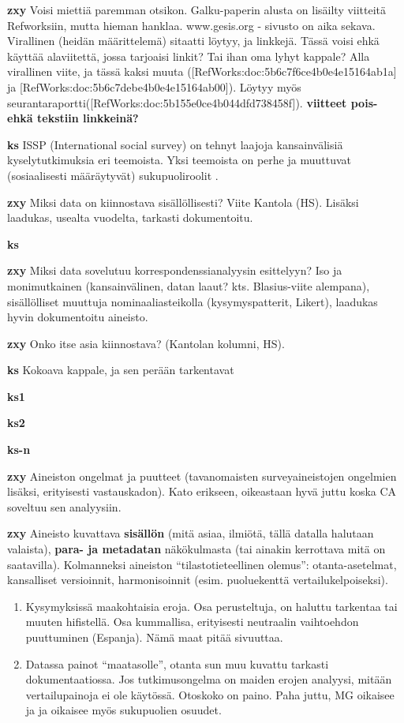 \documentclass[
  finnish,
]{book}
\begin{document}
\textbf{zxy} Voisi miettiä paremman otsikon. Galku-paperin alusta on lisäilty viitteitä Refworksiin, mutta hieman hanklaa. www.gesis.org - sivusto on aika sekava. Virallinen (heidän määrittelemä) sitaatti löytyy, ja linkkejä. Tässä voisi ehkä käyttää alaviitettä, jossa tarjoaisi linkit? Tai ihan oma lyhyt kappale? Alla virallinen viite, ja tässä kaksi muuta ({[}RefWorks:doc:5b6c7f6ce4b0e4e15164ab1a{]} ja {[}RefWorks:doc:5b6c7debe4b0e4e15164ab00{]}). Löytyy myös seurantaraportti({[}RefWorks:doc:5b155e0ce4b044dfd738458f{]}). \textbf{viitteet pois- ehkä tekstiin linkkeinä?}

\textbf{ks} ISSP (International social survey) on tehnyt laajoja kansainvälisiä kyselytutkimuksia eri teemoista. Yksi teemoista on perhe ja muuttuvat (sosiaalisesti määräytyvät) sukupuoliroolit \citep{RefWorks:doc:5b6c7b0de4b0fd36f5bb4c2a}.

\textbf{zxy} Miksi data on kiinnostava sisällöllisesti? Viite Kantola (HS). Lisäksi laadukas, usealta vuodelta, tarkasti dokumentoitu.

\textbf{ks}

\textbf{zxy} Miksi data sovelutuu korrespondenssianalyysin esittelyyn? Iso ja monimutkainen (kansainvälinen, datan laaut? kts. Blasius-viite alempana), sisällölliset muuttuja nominaaliasteikolla (kysymyspatterit, Likert), laadukas hyvin dokumentoitu aineisto.

\textbf{zxy} Onko itse asia kiinnostava? (Kantolan kolumni, HS).

\textbf{ks} Kokoava kappale, ja sen perään tarkentavat

\textbf{ks1}

\textbf{ks2}

\textbf{ks-n}

\textbf{zxy} Aineiston ongelmat ja puutteet (tavanomaisten surveyaineistojen ongelmien lisäksi, erityisesti vastauskadon). Kato erikseen, oikeastaan hyvä juttu koska CA soveltuu sen analyysiin.

\textbf{zxy} Aineisto kuvattava \textbf{sisällön} (mitä asiaa, ilmiötä, tällä datalla halutaan valaista), \textbf{para- ja metadatan} näkökulmasta (tai ainakin kerrottava mitä on saatavilla). Kolmanneksi aineiston ``tilastotieteellinen olemus'': otanta-asetelmat, kansalliset versioinnit, harmonisoinnit (esim. puoluekenttä vertailukelpoiseksi).

\begin{enumerate}
\def\labelenumi{\arabic{enumi}.}
\item
  Kysymyksissä maakohtaisia eroja. Osa perusteltuja, on haluttu tarkentaa tai muuten hifistellä. Osa kummallisa, erityisesti neutraalin vaihtoehdon puuttuminen (Espanja). Nämä maat pitää sivuuttaa.
\item
  Datassa painot ``maatasolle'', otanta sun muu kuvattu tarkasti dokumentaatiossa. Jos tutkimusongelma on maiden erojen analyysi, mitään vertailupainoja ei ole käytössä. Otoskoko on paino. Paha juttu, MG oikaisee ja ja oikaisee myös sukupuolien osuudet.
\end{enumerate}
\end{document}
